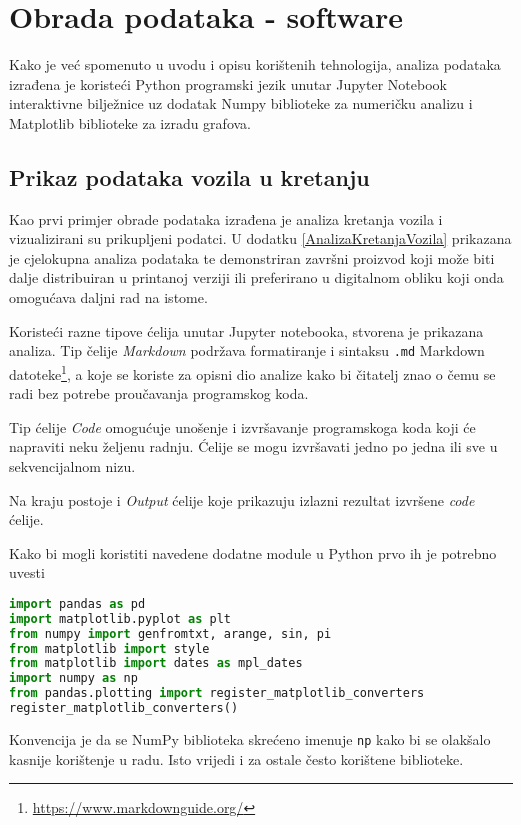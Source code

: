 \chapter{Obrada podataka - software}\label{ch:Software}
Kako je već spomenuto u uvodu i opisu korištenih tehnologija, analiza podataka izrađena je koristeći Python programski jezik unutar Jupyter Notebook interaktivne bilježnice uz dodatak Numpy biblioteke za numeričku analizu i Matplotlib biblioteke za izradu grafova.

\section{Prikaz podataka vozila u kretanju}
Kao prvi primjer obrade podataka izrađena je analiza kretanja vozila i vizualizirani su prikupljeni podatci.
U dodatku \ref{AnalizaKretanjaVozila} prikazana je cjelokupna analiza podataka te demonstriran završni proizvod koji može biti dalje distribuiran u printanoj verziji ili preferirano u digitalnom obliku koji onda omogućava daljni rad na istome.

Koristeći razne tipove ćelija unutar Jupyter notebooka, stvorena je prikazana analiza.
Tip čelije \textit{Markdown} podržava formatiranje i sintaksu \texttt{.md} Markdown datoteke\footnote{\url{https://www.markdownguide.org/}}, a koje se koriste za opisni dio analize kako bi čitatelj znao o čemu se radi bez potrebe proučavanja programskog koda.

Tip ćelije \textit{Code} omogućuje unošenje i izvršavanje programskoga koda koji će napraviti neku željenu radnju.
Ćelije se mogu izvršavati jedno po jedna ili sve u sekvencijalnom nizu.

Na kraju postoje i \textit{Output} ćelije koje prikazuju izlazni rezultat izvršene \textit{code} ćelije.

Kako bi mogli koristiti navedene dodatne module u Python prvo ih je potrebno uvesti
\begin{lstlisting}[language=Python]
import pandas as pd
import matplotlib.pyplot as plt
from numpy import genfromtxt, arange, sin, pi
from matplotlib import style
from matplotlib import dates as mpl_dates
import numpy as np
from pandas.plotting import register_matplotlib_converters
register_matplotlib_converters()
\end{lstlisting}

Konvencija je da se NumPy biblioteka skrećeno imenuje \texttt{np} kako bi se olakšalo kasnije korištenje u radu.
Isto vrijedi i za ostale često korištene biblioteke.

